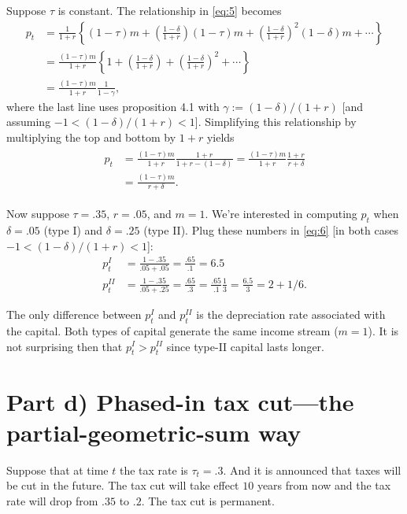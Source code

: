 \documentclass[12pt]{pracjourn_rwr}
\theoremstyle{definition}
\theoremstyle{remark}
\begin{document}
Suppose $\tau$ is constant.
The relationship in \eqref{eq:5} becomes
\begin{align*}
p_{t} &= \frac{1}{1+r} \left\{
(1-\tau)m + \left( \frac{1-\delta}{1+r} \right) (1-\tau)m + \left( \frac{1-\delta}{1+r} \right)^{2}(1-\delta) m + \cdots
\right\} \\
&= \frac{(1-\tau)m}{1+r} \left\{
1 + \left( \frac{1-\delta}{1+r} \right) + \left( \frac{1-\delta}{1+r} \right)^{2} + \cdots
\right\} \\
&= \frac{(1-\tau)m}{1+r} \frac{1}{1 - \gamma},
\end{align*}
where the last line uses proposition 4.1 with $\gamma := (1-\delta)/(1+r)$
[and assuming $-1 < (1-\delta) / (1+r) < 1$].
Simplifying this relationship by multiplying the top and bottom by $1+r$ yields
\begin{align}
\label{eq:6}
\begin{split}
p_{t} &= \frac{(1-\tau)m}{1+r} \frac{1+r}{1+r - (1-\delta)} =
\frac{(1-\tau)m}{1+r} \frac{1+r}{r + \delta} \\
&= \frac{(1-\tau)m}{r+\delta}.
\end{split}
\end{align}

Now suppose $\tau = .35$, $r = .05$, and $m = 1$.
We're interested in computing $p_{t}$ when $\delta = .05$ (type I) and $\delta = .25$ (type II).
Plug these numbers in \eqref{eq:6} [in both cases $-1 < (1-\delta) / (1+r) < 1$]:
\begin{align*}
p^{I}_{t} &= \frac{1-.35}{.05 + .05} = \frac{.65}{.1} = 6.5 \\
p^{II}_{t} &= \frac{1-.35}{.05 + .25} = \frac{.65}{.3} = \frac{.65}{.1} \frac{1}{3} = \frac{6.5}{3} = 2 + 1/6.
\end{align*}

The only difference between $p_{t}^{I}$ and $p_{t}^{II}$ is the depreciation rate associated with the capital.
Both types of capital generate the same income stream ($m = 1$).
It is not surprising then that $p_{t}^{I} > p_{t}^{II}$ since type-II capital lasts longer.

\section{Part d) Phased-in tax cut---the partial-geometric-sum way}
\label{sec:part-d-geometric-sum}

Suppose that at time $t$ the tax rate is $\tau_{t} = .3$.
And it is announced that taxes will be cut in the future.
The tax cut will take effect $10$ years from now and the tax rate will drop from $.35$ to $.2$.
The tax cut is permanent.
\end{document}
